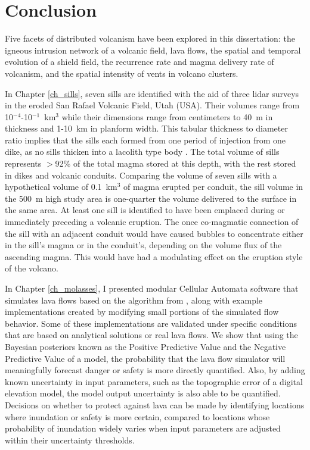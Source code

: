 \chapter[Conclusion]{Conclusion}

Five facets of distributed volcanism have been explored in this dissertation: the igneous intrusion network of a volcanic field, lava flows, the spatial and temporal evolution of a shield field, the recurrence rate and magma delivery rate of volcanism, and the spatial intensity of vents in volcano clusters. 

In Chapter \ref{ch_sills}, seven sills are identified with the aid of three lidar surveys in the eroded San Rafael Volcanic Field, Utah (USA). Their volumes range from 10$^{-4}$-10$^{-1}$~km$^3$ while their dimensions range from centimeters to 40~m in thickness and 1-10~km in planform width. This tabular thickness to diameter ratio implies that the sills each formed from one period of injection from one dike, as no sills thicken into a lacolith type body \citep{gudmundsson2012magma}. The total volume of sills represents $>$92\% of the total magma stored at this depth, with the rest stored in dikes and volcanic conduits. Comparing the volume of seven sills with a hypothetical volume of 0.1~km$^3$ of magma erupted per conduit, the sill volume in the 500~m high study area is one-quarter the volume delivered to the surface in the same area. At least one sill is identified to have been emplaced during or immediately preceding a volcanic eruption. The once co-magmatic connection of the sill with an adjacent conduit would have caused bubbles to concentrate either in the sill's magma or in the conduit's, depending on the volume flux of the ascending magma. This would have had a modulating effect on the eruption style of the volcano.

In Chapter \ref{ch_molasses}, I presented modular Cellular Automata software that simulates lava flows based on the algorithm from \citet{connor2012probabilistic}, along with example implementations created by modifying small portions of the simulated flow behavior. Some of these implementations are validated under specific conditions that are based on analytical solutions or real lava flows. We show that using the Bayesian posteriors known as the Positive Predictive Value and the Negative Predictive Value of a model, the probability that the lava flow simulator will meaningfully forecast danger or safety is more directly quantified. Also, by adding known uncertainty in input parameters, such as the topographic error of a digital elevation model, the model output uncertainty is also able to be quantified. Decisions on whether to protect against lava can be made by identifying locations where inundation or safety is more certain, compared to locations whose probability of inundation widely varies when input parameters are adjusted within their uncertainty thresholds.

